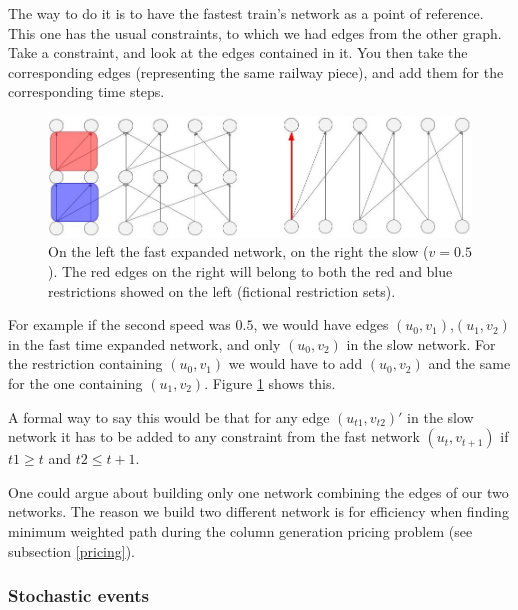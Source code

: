 \documentclass[14pt,a4paper]{article}
\theoremstyle{definition}
\numberwithin{equation}{subsection}
\begin{document}
The way to do it is to have the fastest train's network as a point of reference. This one has the usual constraints, to which we had edges from the other graph. Take a constraint, and look at the edges contained in it. You then take the corresponding edges (representing the same railway piece), and add them for the corresponding time steps.

\begin{figure}[h]
	\centering
	\includegraphics[width=0.7\linewidth]{img/ten_constraints_multiple_constraints.jpg}
	\caption{On the left the fast expanded network, on the right the slow ($v = 0.5$). The red edges on the right will belong to both the red and blue restrictions showed on the left (fictional restriction sets).}
	\label{fig:multiple constraints}
\end{figure} 

For example if the second speed was $0.5$, we would have edges $(u_0,v_1)$,$(u_1,v_2)$ in the fast time expanded network, and only $(u_0,v_2)$ in the slow network. For the restriction containing $(u_0,v_1)$ we would have to add $(u_0,v_2)$ and the same for the one containing $(u_1,v_2)$. Figure \ref{fig:multiple constraints} shows this.




A formal way to say this would be that for any edge $(u_{t1},v_{t2})'$ in the slow network it has to be added to any constraint from the fast network $(u_t,v_{t+1})$ if $t1\geq t$ and $t2 \leq t+1$.
\newline


One could argue about building only one network combining the edges of our two networks. The reason we build two different network is for efficiency when finding minimum weighted path during the column generation pricing problem (see subsection \ref{pricing}).

\subsubsection{Stochastic events}
\end{document}
